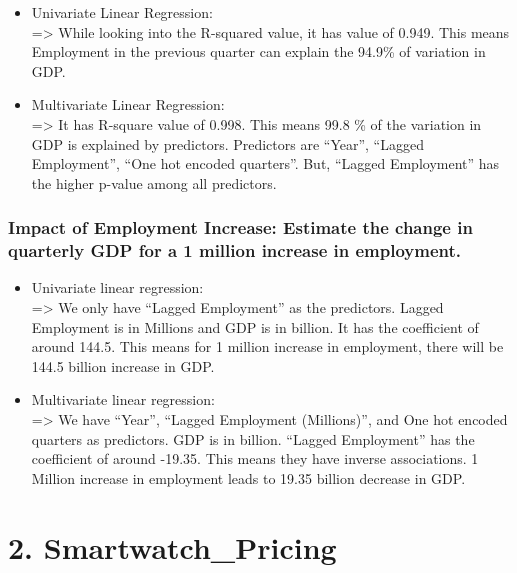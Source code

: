 \documentclass[11pt]{article}
\providecommand{\tightlist}{%
      \setlength{\itemsep}{0pt}\setlength{\parskip}{0pt}}
\begin{document}
\begin{itemize}
\item
  Univariate Linear Regression:\\
  =\textgreater{} While looking into the R-squared value, it has value
  of 0.949. This means Employment in the previous quarter can explain
  the 94.9\% of variation in GDP.
\item
  Multivariate Linear Regression:\\
  =\textgreater{} It has R-square value of 0.998. This means 99.8 \% of
  the variation in GDP is explained by predictors. Predictors are
  ``Year'', ``Lagged Employment'', ``One hot encoded quarters''. But,
  ``Lagged Employment'' has the higher p-value among all predictors.
\end{itemize}

    \hypertarget{impact-of-employment-increase-estimate-the-change-in-quarterly-gdp-for-a-1-million-increase-in-employment.}{%
\subsubsection{Impact of Employment Increase: Estimate the change in
quarterly GDP for a 1 million increase in
employment.}\label{impact-of-employment-increase-estimate-the-change-in-quarterly-gdp-for-a-1-million-increase-in-employment.}}

\begin{itemize}
\tightlist
\item
  Univariate linear regression:\\
  =\textgreater{} We only have ``Lagged Employment'' as the predictors.
  Lagged Employment is in Millions and GDP is in billion. It has the
  coefficient of around 144.5. This means for 1 million increase in
  employment, there will be 144.5 billion increase in GDP.
\item
  Multivariate linear regression:\\
  =\textgreater{} We have ``Year'', ``Lagged Employment (Millions)'',
  and One hot encoded quarters as predictors. GDP is in billion.
  ``Lagged Employment'' has the coefficient of around -19.35. This means
  they have inverse associations. 1 Million increase in employment leads
  to 19.35 billion decrease in GDP.
\end{itemize}

    \hypertarget{smartwatch_pricing}{%
\section{2. Smartwatch\_Pricing}\label{smartwatch_pricing}}
\end{document}
